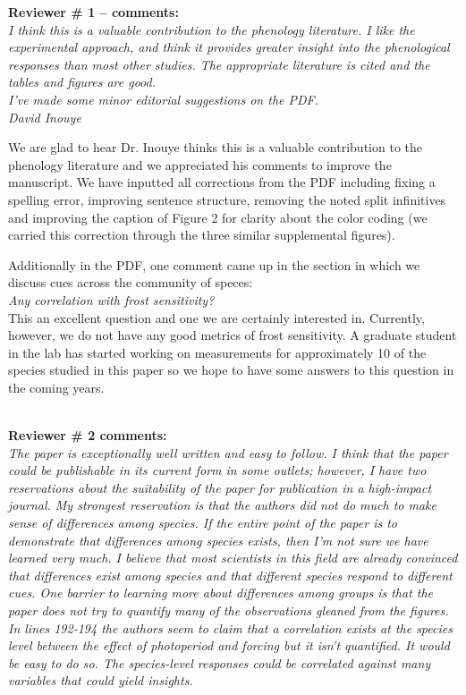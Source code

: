 \documentclass[11pt,a4paper]{article}
\begin{document}
{\bf Reviewer \# 1 -- comments:} \\

\emph{I think this is a valuable contribution to the phenology literature. I like the experimental approach, and think it provides greater insight into the phenological responses than most other studies.  The appropriate literature is cited and the tables and figures are good.\\
I've made some minor editorial suggestions on the PDF.\\
David Inouye}

We are glad to hear Dr. Inouye thinks this is a valuable contribution to the phenology literature and we appreciated his comments to improve the manuscript. We have inputted all corrections from the PDF including fixing a spelling error, improving sentence structure, removing the noted split infinitives and improving the caption of Figure 2 for clarity about the color coding (we carried this correction through the three similar supplemental figures). 

Additionally in the PDF, one comment came up in the section in which we discuss cues across the community of speces:\\
\emph{Any correlation with frost sensitivity?}\\

This an excellent question and one we are certainly interested in. Currently, however, we do not have any good metrics of frost sensitivity. A graduate student in the lab has started working on measurements for approximately 10 of the species studied in this paper so we hope to have some answers to this question in the coming years.

\\
{\bf Reviewer \# 2 comments:} \\

\emph{The paper is exceptionally well written and easy to follow. I think that the paper could be
publishable in its current form in some outlets; however, I have two reservations about the
suitability of the paper for publication in a high-impact journal. My strongest reservation
is that the authors did not do much to make sense of differences among species. If the entire
point of the paper is to demonstrate that differences among species exists, then I'm not sure
we have learned very much. I believe that most scientists in this field are already convinced
that differences exist among species and that different species respond to different cues. One barrier to learning more about differences among groups is that the paper does not try to quantify many of the observations gleaned from the figures. In lines 192-194 the authors seem
to claim that a correlation exists at the species level between the effect of photoperiod and
forcing but it isn't quantified. It would be easy to do so. The species-level responses could be correlated against many variables that could yield insights.}\\
\end{document}
